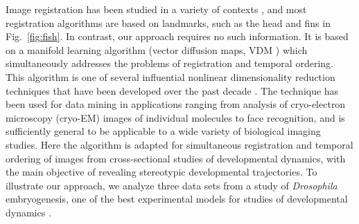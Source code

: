 \documentclass{pnastwo}
\newcommand{\fig}[0]{Fig.}
\begin{document}
\begin{article}
Image registration has been studied in a variety of contexts \cite{zitova2003image, rowley1998rotation, hajnal2010medical, greenspan1994rotation, zhao2003face}, 
and most registration algorithms are based on landmarks, such as the head and fins in \fig~\ref{fig:fish}.
%
In contrast, our approach requires no such information. 
%
It is based on a manifold learning algorithm (vector diffusion maps, VDM \cite{singer2012vector}) which simultaneously addresses the problems of registration and temporal ordering. 
%
This algorithm is one of several influential nonlinear dimensionality reduction techniques that have been developed over the past decade \cite{Belkin2003, coifman2005geometric, coifman2006geometric, tenenbaum2000global, roweis2000nonlinear}. 
%
The technique has been used for data mining in
applications ranging from analysis of cryo-electron microscopy (cryo-EM) images of individual molecules to face recognition, and is sufficiently general to be applicable to a wide variety of biological imaging studies. 
%
Here the algorithm is adapted for simultaneous registration and temporal ordering of images from cross-sectional studies of developmental dynamics, with the main objective of revealing stereotypic developmental trajectories.
%
To illustrate our approach, we analyze three data sets from a study of {\it Drosophila} embryogenesis, one of the best experimental models for studies of developmental dynamics \cite{jaeger2012drosophila}.
%
%
%
%

%
%
%
%



\end{article}
\end{document}
